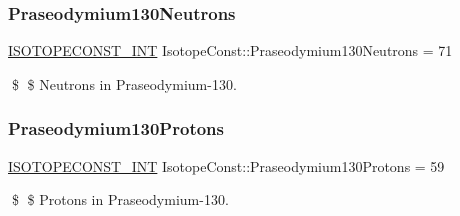 \subsubsection{\texorpdfstring{Praseodymium130\+Neutrons}{Praseodymium130Neutrons}}
{\footnotesize\ttfamily \mbox{\hyperlink{group___isotope_const-_macros_ga5f18360b3e99483a35c32d789e62621c}{I\+S\+O\+T\+O\+P\+E\+C\+O\+N\+S\+T\+\_\+\+I\+NT}} Isotope\+Const\+::\+Praseodymium130\+Neutrons = 71}

\$ \$ Neutrons in Praseodymium-\/130. \mbox{\label{group___isotope_const-_praseodymium-_pr130_gabf88ed142f61f196e0b8f2079a166049}} 
\subsubsection{\texorpdfstring{Praseodymium130\+Protons}{Praseodymium130Protons}}
{\footnotesize\ttfamily \mbox{\hyperlink{group___isotope_const-_macros_ga5f18360b3e99483a35c32d789e62621c}{I\+S\+O\+T\+O\+P\+E\+C\+O\+N\+S\+T\+\_\+\+I\+NT}} Isotope\+Const\+::\+Praseodymium130\+Protons = 59}

\$ \$ Protons in Praseodymium-\/130. 